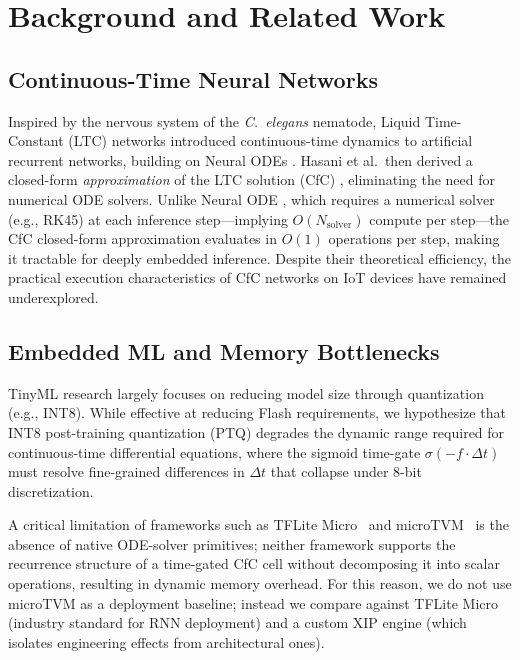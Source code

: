 \documentclass[conference]{IEEEtran}
\newcommand{\dt}{\Delta t}
\begin{document}
\section{Background and Related Work}

\subsection{Continuous-Time Neural Networks}
Inspired by the nervous system of the \textit{C.~elegans} nematode, Liquid
Time-Constant (LTC) networks \cite{hasani2020liquid} introduced
continuous-time dynamics to artificial recurrent networks, building on Neural
ODEs \cite{chen2018neuralode}. Hasani et al.\ then derived a closed-form
\emph{approximation} of the LTC solution (CfC) \cite{hasani2022closed},
eliminating the need for numerical ODE solvers.
Unlike Neural ODE \cite{chen2018neuralode}, which requires a numerical solver
(e.g., RK45) at each inference step---implying $O(N_{\text{solver}})$ compute
per step---the CfC closed-form approximation evaluates in $O(1)$ operations
per step, making it tractable for deeply embedded inference. Despite their
theoretical efficiency, the practical execution characteristics of CfC networks
on IoT devices \cite{lin2020mcunet} have remained underexplored.

\subsection{Embedded ML and Memory Bottlenecks}
TinyML research \cite{warden2020tinyml,schottenhamml2020tinyml} largely
focuses on reducing model size through quantization (e.g., INT8). While
effective at reducing Flash requirements, we hypothesize that INT8 post-training
quantization (PTQ) degrades the dynamic range required for continuous-time
differential equations, where the sigmoid time-gate $\sigma(-f \cdot \dt)$
must resolve fine-grained differences in $\dt$ that collapse under 8-bit
discretization.

A critical limitation of frameworks such as TFLite Micro~\cite{david2021tflitemicro}
and microTVM~\cite{wang2021microtvm} is the absence of native ODE-solver
primitives; neither framework supports the recurrence structure of a
time-gated CfC cell without decomposing it into scalar operations, resulting
in dynamic memory overhead. For this reason, we do not use microTVM as a
deployment baseline; instead we compare against TFLite Micro (industry
standard for RNN deployment) and a custom XIP engine (which isolates
engineering effects from architectural ones).
\end{document}
